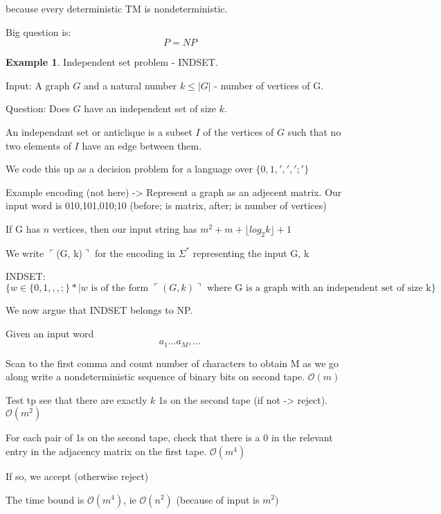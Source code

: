 \documentclass[a4paper,12pt]{article}
\theoremstyle{definition}
\newtheorem{example}[counter]{Example}
\theoremstyle{remark}
\begin{document}
because every deterministic TM is nondeterministic.

Big question is:
\begin{equation*}
    P = NP
\end{equation*}

\begin{example}
    Independent set problem - INDSET.

    Input: A graph $G$ and a natural number $k \leq |G|$ - number of vertices of G.

    Question: Does $G$ have an independent set of size $k$.

    An independant set or anticlique is a subset $I$ of the vertices of $G$ such that no two elements of $I$ have an edge between them.

    We code this up as a decision problem for a language over $\{0, 1, ',', ';'\}$

    Example encoding (not here) ->
    Represent a graph as an adjecent matrix.
    Our input word is 010,101,010;10 (before; is matrix, after; is number of vertices)

    If G has $n$ vertices, then our input string has $m^2 + m + \lfloor log_2 k \rfloor + 1$

    We write $\ulcorner$(G, k)$\urcorner$ for the encoding in $\Sigma^*$ representing the input G, k

    INDSET:
    \begin{dmath*}
        \{w \in \{0, 1, ,, ;\}* | w \text{ is of the form } \ulcorner (G, k) \urcorner \text{ where G is a graph with an independent set of size k}\}
    \end{dmath*}

    We now argue that INDSET belongs to NP.

    Given an input word
    \begin{equation*}
        a_1 \dots a_M, \dots
    \end{equation*}

    Scan to the first comma and count number of characters to obtain M as we go along write a nondeterministic sequence of binary bits on second tape. $\mathscr{O}(m)$

    Test tp see that there are exactly $k$ 1s on the second tape (if not -> reject). $\mathscr{O}(m^2)$

    For each pair of 1s on the second tape, check that there is a $0$ in the relevant entry in the adjacency matrix on the first tape. $\mathscr{O}(m^4)$

    If so, we accept (otherwise reject)

    The time bound is $\mathscr{O}(m^4)$, ie $\mathscr{O}(n^2)$ (because of input is $m^2$)
\end{example}
\end{document}

